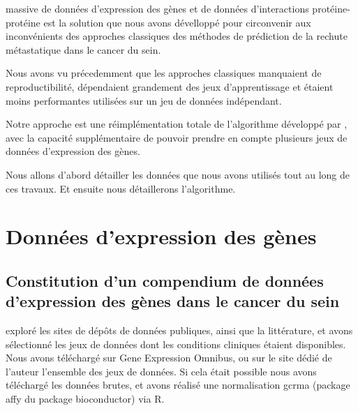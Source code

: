 			 massive de données d'expression des gènes et de données d'interactions protéine-protéine est la solution que nous avons dévelloppé pour circonvenir aux inconvénients des approches classiques des méthodes de prédiction de la rechute métastatique dans le cancer du sein.

			Nous avons vu précedemment que les approches classiques manquaient de reproductibilité, dépendaient grandement des jeux d'apprentissage et étaient moins performantes utilisées sur un jeu de données indépendant.

			Notre approche est une réimplémentation totale de l'algorithme développé par \citeauthor{Chuang2007}, avec la capacité supplémentaire de pouvoir prendre en compte plusieurs jeux de données d'expression des gènes.

			Nous allons d'abord détailler les données que nous avons utilisés tout au long de ces travaux.
			Et ensuite nous détaillerons l'algorithme.

	\section{\textcolor{mygreen}{Données d'expression des gènes}}\label{sec:GEP}

		\subsection{\textcolor{mygreen}{Constitution d'un compendium de données d'expression des gènes dans le cancer du sein}}
			 exploré les sites de dépôts de données publiques, ainsi que la littérature, et avons sélectionné les jeux de données dont les conditions cliniques étaient disponibles.
			Nous avons téléchargé sur Gene Expression Omnibus, ou sur le site dédié de l'auteur l'ensemble des jeux de données. Si cela était possible nous avons téléchargé les données brutes, et avons réalisé une normalisation gcrma (package affy du package bioconductor) via R.

